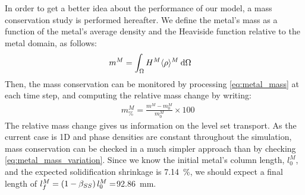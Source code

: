 In order to get a better idea about the performance of our model, a mass conservation study is performed hereafter. 
We define the metal's mass as a function of the metal's average density and the Heaviside function relative to the 
metal domain, as follows:
\begin{align}
\label{eq:metal_mass}
& m^M = \int_{\Omega} H^M \langle \rho \rangle^M\: \mathrm{d}\Omega	
\end{align}
Then, the mass conservation can be monitored by processing \cref{eq:metal_mass} at each time step, and computing
the relative mass change by writing:
\begin{align}
\label{eq:metal_mass_variation}
&  m^M_\% = \frac{m^M - m^M_0}{m^M_0} \times 100	
\end{align}
The relative mass change gives us information on the level set transport.
As the current case is 1D and phase densities are constant throughout the simulation, mass conservation can be 
checked in a much simpler approach than by checking \cref{eq:metal_mass_variation}. Since we know the initial metal's column
length, $l^M_0$, and the expected solidification shrinkage is \SI{7.14}{\percent}, we should expect a final length of 
$l^M_f= \left( 1-\beta_{SS} \right) l^M_0 =$\SI{92.86}{\milli\metre}. 
